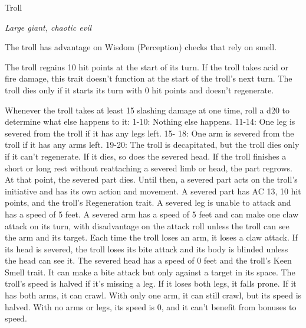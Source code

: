 \begin{monsterbox}{Troll}
\begin{hangingpar}
\textit{Large giant, chaotic evil}
\end{hangingpar}
\dndline%
\basics[%
armorclass = 15,
hitpoints = 8d10 + 40,
speed = {30 ft.}
]
\dndline%
\stats[%
STR = \stat{18},
DEX = \stat{13},
CON = \stat{20},
INT = \stat{7},
WIS = \stat{9},
CHA = \stat{7}
]
\dndline%
\details[%
skills={Perception +2, },
damageimmunities={},
savingthrows={},
conditionimmunities={},
damageresistances={},
damagevulnerabilities={},
senses={darkvision 60 ft., passive Perception 12},
languages={Giant},
challenge=5
]
\dndline%
\begin{monsteraction}
The troll has advantage on Wisdom (Perception) checks that rely on smell.
\end{monsteraction}
\begin{monsteraction}[Regeneration]
The troll regains 10 hit points at the start of its turn. If the troll takes acid or fire damage, this trait doesn't function at the start of the troll's next turn. The troll dies only if it starts its turn with 0 hit points and doesn't regenerate.
\end{monsteraction}
\begin{monsteraction}
Whenever the troll takes at least 15 slashing damage at one time, roll a d20 to determine what else happens to it:
1-10: Nothing else happens.
11-14: One leg is severed from the troll if it has any legs left.
15- 18: One arm is severed from the troll if it has any arms left.
19-20: The troll is decapitated, but the troll dies only if it can't regenerate. If it dies, so does the severed head.
If the troll finishes a short or long rest without reattaching a severed limb or head, the part regrows. At that point, the severed part dies. Until then, a severed part acts on the troll's initiative and has its own action and movement. A severed part has AC 13, 10 hit points, and the troll's Regeneration trait.
A severed leg is unable to attack and has a speed of 5 feet.
A severed arm has a speed of 5 feet and can make one claw attack on its turn, with disadvantage on the attack roll unless the troll can see the arm and its target. Each time the troll loses an arm, it loses a claw attack.
If its head is severed, the troll loses its bite attack and its body is blinded unless the head can see it. The severed head has a speed of 0 feet and the troll's Keen Smell trait. It can make a bite attack but only against a target in its space.
The troll's speed is halved if it's missing a leg. If it loses both legs, it falls prone. If it has both arms, it can crawl. With only one arm, it can still crawl, but its speed is halved. With no arms or legs, its speed is 0, and it can't benefit from bonuses to speed.

\end{monsteraction}
\end{monsterbox}
